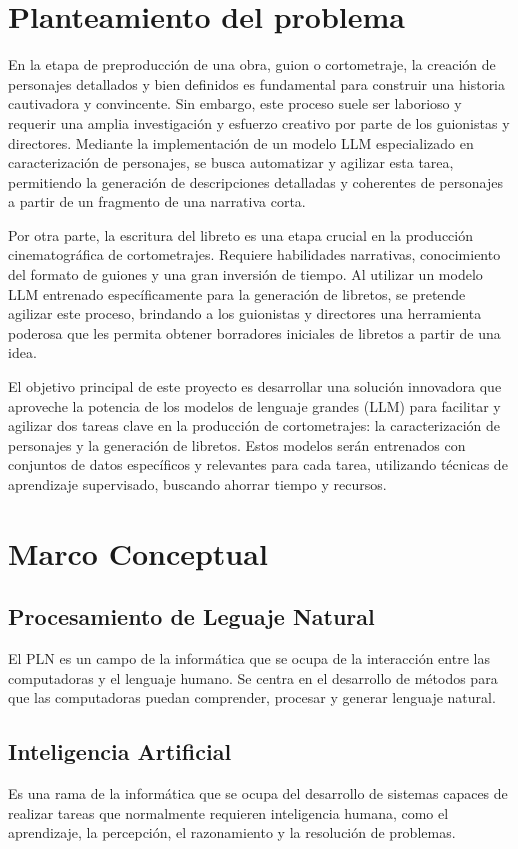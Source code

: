 \documentclass[journal,onecolumn]{IEEEtran}
\begin{document}
	
	\section{Planteamiento del problema}
	
	
	En la etapa de preproducción de una obra, guion o cortometraje, la creación de personajes detallados y bien definidos es fundamental para construir una historia cautivadora y convincente. Sin embargo, este proceso suele ser laborioso y requerir una amplia investigación y esfuerzo creativo por parte de los guionistas y directores. Mediante la implementación de un modelo LLM especializado en caracterización de personajes, se busca automatizar y agilizar esta tarea, permitiendo la generación de descripciones detalladas y coherentes de personajes a partir de un fragmento de una narrativa corta.
	
	Por otra parte, la escritura del libreto es una etapa crucial en la producción cinematográfica de cortometrajes. Requiere habilidades narrativas, conocimiento del formato de guiones y una gran inversión de tiempo. Al utilizar un modelo LLM entrenado específicamente para la generación de libretos, se pretende agilizar este proceso, brindando a los guionistas y directores una herramienta poderosa que les permita obtener borradores iniciales de libretos a partir de una idea.
	
	El objetivo principal de este proyecto es desarrollar una solución innovadora que aproveche la potencia de los modelos de lenguaje grandes (LLM) para facilitar y agilizar dos tareas clave en la producción de cortometrajes: la caracterización de personajes y la generación de libretos. Estos modelos serán entrenados con conjuntos de datos específicos y relevantes para cada tarea, utilizando técnicas de aprendizaje supervisado, buscando ahorrar tiempo y recursos.
	\section{Marco Conceptual}
	\subsection{Procesamiento de Leguaje Natural}
	El PLN es un campo de la informática que se ocupa de la interacción entre las computadoras y el lenguaje humano. Se centra en el desarrollo de métodos para que las computadoras puedan comprender, procesar y generar lenguaje natural.
	\subsection{Inteligencia Artificial}
	Es una rama de la informática que se ocupa del desarrollo de sistemas capaces de realizar tareas que normalmente requieren inteligencia humana, como el aprendizaje, la percepción, el razonamiento y la resolución de problemas. 
\end{document}
